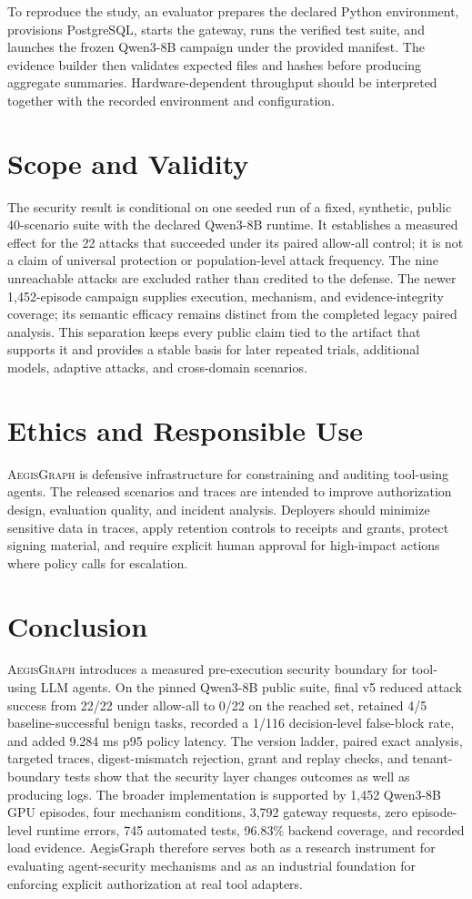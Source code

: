 \documentclass[10pt,twocolumn]{article}
\newcommand{\system}{\textsc{AegisGraph}\xspace}
\begin{document}
To reproduce the study, an evaluator prepares the declared Python environment, provisions PostgreSQL, starts the gateway, runs the verified test suite, and launches the frozen Qwen3-8B campaign under the provided manifest. The evidence builder then validates expected files and hashes before producing aggregate summaries. Hardware-dependent throughput should be interpreted together with the recorded environment and configuration.

\section{Scope and Validity}
The security result is conditional on one seeded run of a fixed, synthetic, public 40-scenario suite with the declared Qwen3-8B runtime. It establishes a measured effect for the 22 attacks that succeeded under its paired allow-all control; it is not a claim of universal protection or population-level attack frequency. The nine unreachable attacks are excluded rather than credited to the defense. The newer 1,452-episode campaign supplies execution, mechanism, and evidence-integrity coverage; its semantic efficacy remains distinct from the completed legacy paired analysis. This separation keeps every public claim tied to the artifact that supports it and provides a stable basis for later repeated trials, additional models, adaptive attacks, and cross-domain scenarios.

\section{Ethics and Responsible Use}
\system is defensive infrastructure for constraining and auditing tool-using agents. The released scenarios and traces are intended to improve authorization design, evaluation quality, and incident analysis. Deployers should minimize sensitive data in traces, apply retention controls to receipts and grants, protect signing material, and require explicit human approval for high-impact actions where policy calls for escalation.

\section{Conclusion}
\system introduces a measured pre-execution security boundary for tool-using LLM agents. On the pinned Qwen3-8B public suite, final v5 reduced attack success from 22/22 under allow-all to 0/22 on the reached set, retained 4/5 baseline-successful benign tasks, recorded a 1/116 decision-level false-block rate, and added 9.284 ms p95 policy latency. The version ladder, paired exact analysis, targeted traces, digest-mismatch rejection, grant and replay checks, and tenant-boundary tests show that the security layer changes outcomes as well as producing logs. The broader implementation is supported by 1,452 Qwen3-8B GPU episodes, four mechanism conditions, 3,792 gateway requests, zero episode-level runtime errors, 745 automated tests, 96.83\% backend coverage, and recorded load evidence. AegisGraph therefore serves both as a research instrument for evaluating agent-security mechanisms and as an industrial foundation for enforcing explicit authorization at real tool adapters.
\end{document}
